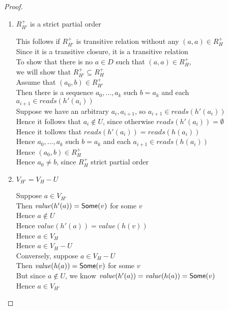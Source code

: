 \begin{proof}
\begin{enumerate}
\item $R^+_{H'}$ is a strict partial order 
  \begin{tabbedproof}
    \oo This follows if $R^+_{H'}$ is transitive relation without any $(a,a) \in R^+_H$ \\
    \oo Since it is a transitive closure, it is a transitive relation \\
    \oo To show that there is no $a \in D$ such that $(a,a) \in R^+_H$, \\
    \ox we will show that $R^+_{H'} \subseteq R^+_H$ \\
    \oo Assume that $(a_0,b) \in R^+_{H'}$ \\
    \oo Then there is a sequence $a_0, \ldots, a_k$ such $b = a_k$ and each $a_{i+1} \in \mathit{reads}(h'(a_i))$ \\
    \oo Suppose we have an arbitrary $a_i, a_{i+1}$, so $a_{i+1} \in \mathit{reads}(h'(a_i))$ \\
    \oo Hence it follows that $a_i \not\in U$, since otherwise $\mathit{reads}(h'(a_i)) = \emptyset$ \\
    \oo Hence it tollows that $\mathit{reads}(h'(a_i)) = \mathit{reads}(h(a_i))$ \\
    \oo Hence $a_0, \ldots, a_k$ such $b = a_k$ and each $a_{i+1} \in \mathit{reads}(h(a_i))$ \\
    \oo Hence $(a_0, b) \in R^+_H$ \\
    \oo Hence $a_0 \not= b$, since $R^+_H$ strict partial order 
  \end{tabbedproof}

\item $V_{H'} = V_H - U$
  \begin{tabbedproof}
    \oo Suppose $a \in V_{H'}$ \\
    \ooo Then $\mathit{value}(h'(a)) = \mathsf{Some}(v)$ for some $v$ \\
    \ooo Hence $a \not\in U$ \\
    \ooo Hence $\mathit{value}(h'(a)) = \mathit{value}(h(v))$  \\
    \ooo Hence $a \in V_H$ \\
    \ooo Hence $a \in V_{H} - U$ \\
    \oo Conversely, suppose $a \in V_{H} - U$ \\
    \ooo Then $\mathit{value}(h(a)) = \mathsf{Some}(v)$ for some $v$ \\
    \ooo But since $a \not\in U$, we know $\mathit{value}(h'(a)) = \mathit{value}(h(a)) = \mathsf{Some}(v)$ \\
    \ooo Hence $a \in V_{H'}$ 
  \end{tabbedproof}


\end{enumerate}
\end{proof}
